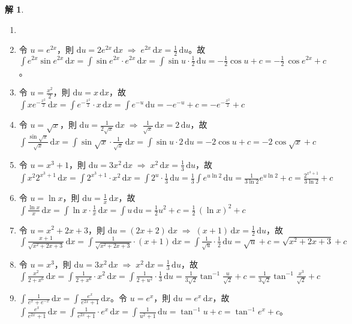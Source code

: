 \documentclass[12pt]{extarticle}
\newcommand{\ds}{\displaystyle}
\newcommand{\ie}{\;\Longrightarrow\;}
\theoremstyle{definition}
\newtheorem*{sol}{解}
\begin{document}
\begin{sol}
  \begin{enumerate}\setlength\itemsep{0em}
    \item[]
    \item 令 $u = e^{2x}$，則 $\ds\text{d}u = 2e^{2x}\,\text{d}x\ie e^{2x}\,\text{d}x = \frac{1}{2}\,\text{d}u$。故 $\ds\int e^{2x}\sin{e^{2x}}\,\mathrm{d}x = \int\sin{e^{2x}}\cdot e^{2x}\,\text{d}x = \int\sin u\cdot\frac{1}{2}\,\text{d}u = -\frac{1}{2}\cos u + c = -\frac{1}{2}\,\cos{e^{2x}} + c$。
    \item 令 $\ds u = \frac{x^2}{2}$，則 $\ds\text{d}u = x\,\text{d}x$，故 $\ds\int x e^{-\frac{x^2}{2}}\,\mathrm{d}x = \int e^{-\frac{x^2}{2}}\cdot x\,\mathrm{d}x = \int e^{-u}\,\text{d}u = -e^{-u} + c = -e^{-\frac{x^2}{2}} + c$
    \item 令 $\ds u = \sqrt{x}$，則 $\ds\text{d}u = \frac{1}{2\sqrt{x}}\,\text{d}x\ie \frac{1}{\sqrt{x}}\,\text{d}x = 2\,\text{d}u$，故 $\ds\int\frac{\sin{\sqrt{x}}}{\sqrt{x}}\,\mathrm{d}x = \int\sin{\sqrt{x}}\cdot\frac{1}{\sqrt{x}}\,\text{d}x = \int\sin u\cdot 2\,\text{d}u = -2\cos u + c = -2\cos{\sqrt{x}} + c$
    \item 令 $\ds u = x^3 + 1$，則 $\ds\text{d} u = 3 x^2\,\text{d}x\ie x^2\,\text{d}x = \frac{1}{3}\,\text{d}u$，故 $\ds\int x^2 2^{x^3 + 1}\,\mathrm{d}x = \int 2^{x^3 + 1}\cdot x^2\,\text{d}x = \int 2^u\cdot\frac{1}{3}\,\text{d}u = \frac{1}{3}\int e^{u\ln 2}\,\text{d}u = \frac{1}{3\ln 2}e^{u\ln 2} + c = \frac{2^{x^3 + 1}}{3\ln 2} + c$
    \item 令 $\ds u = \ln x$，則 $\ds\text{d} u = \frac{1}{x}\,\text{d}x$，故 $\ds\int\frac{\ln x}{x}\,\mathrm{d}x = \int\ln x\cdot\frac{1}{x}\,\text{d}x = \int u\,\text{d}u = \frac{1}{2} u^2 + c = \frac{1}{2}\,(\ln x)^2 + c$
    \item 令 $\ds u = x^2 + 2x + 3$，則 $\ds\text{d} u = (2 x + 2)\,\text{d}x\ie (x + 1)\,\text{d}x = \frac{1}{2}\,\text{d}u$，故 $\ds\int\frac{x + 1}{\sqrt{x^2 + 2x + 3}}\,\mathrm{d}x = \int\frac{1}{\sqrt{x^2 + 2x + 3}}\cdot(x + 1)\,\text{d}x = \int\frac{1}{\sqrt{u}}\cdot\frac{1}{2}\,\text{d}u = \sqrt{u} + c = \sqrt{x^2 + 2x + 3} + c$
    \item 令 $\ds u = x^3$，則 $\ds\text{d} u = 3x^2\,\text{d}x\ie x^2\,\text{d}x = \frac{1}{3}\,\text{d}u$，故 $\ds\int\frac{x^2}{2 + x^6}\,\mathrm{d}x = \int\frac{1}{2 + x^6}\cdot x^2\,\text{d}x = \int\frac{1}{2 + u^2}\cdot\frac{1}{3}\,\text{d}u = \frac{1}{3\sqrt{2}}\tan^{-1}\frac{u}{\sqrt{2}} + c = \frac{1}{3\sqrt{2}}\tan^{-1}{\frac{x^3}{\sqrt{2}}} + c$
    \item $\ds\int\frac{1}{e^x + e^{-x}}\,\mathrm{d}x = \int\frac{e^x}{e^{2x} + 1}\,\text{d}x$。令 $\ds u = e^x$，則 $\ds\text{d}u = e^x\,\text{d}x$，故 $\ds\int\frac{e^x}{e^{2x} + 1}\,\text{d}x = \int\frac{1}{e^{2x} + 1}\cdot e^x\,\text{d}x = \int\frac{1}{u^2 + 1}\,\text{d}u = \tan^{-1}u + c = \tan^{-1}{e^{x}} + c$。

\end{enumerate}
\end{sol}
\end{document}
